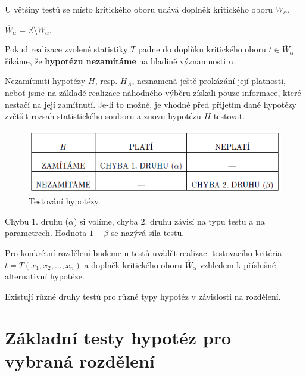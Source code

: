 \begin{compactitem}
    \item U většiny testů se místo kritického oboru udává doplněk kritického oboru $\overline{W}_{\alpha}$. \begin{compactitem}
        \item $\overline{W}_{\alpha} = \mathbb{R} \setminus W_{\alpha}$.
        \item Pokud realizace zvolené statistiky $T$ padne do doplňku kritického oboru $t \in \overline{W}_{\alpha}$ říkáme, že \textbf{hypotézu nezamítáme} na hladině významnosti $\alpha$.
    \end{compactitem}

    \item Nezamítnutí hypotézy $H$, resp. $H_A$, neznamená ještě prokázání její platnosti, neboť jsme na základě realizace náhodného výběru získali pouze informace, které nestačí na její zamítnutí. Je-li to možné, je vhodné před přijetím dané hypotézy zvětšit rozsah statistického souboru a znovu hypotézu $H$ testovat.

    \begin{figure}[H]
        \centering
        \includegraphics[width=0.75\linewidth]{hypoteza.png}
        \caption{Testování hypotézy.}
    \end{figure}

    \item Chybu 1. druhu ($\alpha$) si volíme, chyba 2. druhu závisí na typu testu a na parametrech. Hodnota $1 - \beta$ se nazývá síla testu.

    \item Pro konkrétní rozdělení budeme u testů uvádět realizaci testovacího kritéria $t = T( x_1, x_2, \ldots, x_n)$ a doplněk kritického oboru $\overline{W}_{\alpha}$ vzhledem k příslušné alternativní hypotéze.

    \item Existují různé druhy testů pro různé typy hypotéz v závislosti na rozdělení.
\end{compactitem}


\section{Základní testy hypotéz pro vybraná rozdělení}

